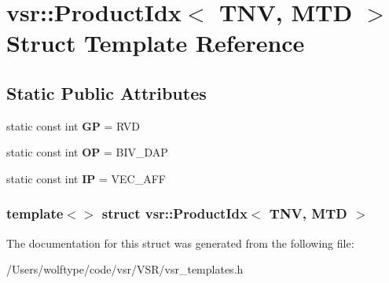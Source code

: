 \hypertarget{structvsr_1_1_product_idx_3_01_t_n_v_00_01_m_t_d_01_4}{\section{vsr\-:\-:Product\-Idx$<$ T\-N\-V, M\-T\-D $>$ Struct Template Reference}
\label{structvsr_1_1_product_idx_3_01_t_n_v_00_01_m_t_d_01_4}
}
\subsection*{Static Public Attributes}
\begin{DoxyCompactItemize}
\item 
\hypertarget{structvsr_1_1_product_idx_3_01_t_n_v_00_01_m_t_d_01_4_afe13c3340442d1068a3e424826551e6e}{static const int {\bfseries G\-P} = R\-V\-D}\label{structvsr_1_1_product_idx_3_01_t_n_v_00_01_m_t_d_01_4_afe13c3340442d1068a3e424826551e6e}

\item 
\hypertarget{structvsr_1_1_product_idx_3_01_t_n_v_00_01_m_t_d_01_4_a05029d10a77f94af3f5ebe42f369819f}{static const int {\bfseries O\-P} = B\-I\-V\-\_\-\-D\-A\-P}\label{structvsr_1_1_product_idx_3_01_t_n_v_00_01_m_t_d_01_4_a05029d10a77f94af3f5ebe42f369819f}

\item 
\hypertarget{structvsr_1_1_product_idx_3_01_t_n_v_00_01_m_t_d_01_4_a330af777fa84e11b86053944602faaf2}{static const int {\bfseries I\-P} = V\-E\-C\-\_\-\-A\-F\-F}\label{structvsr_1_1_product_idx_3_01_t_n_v_00_01_m_t_d_01_4_a330af777fa84e11b86053944602faaf2}

\end{DoxyCompactItemize}
\subsubsection*{template$<$$>$ struct vsr\-::\-Product\-Idx$<$ T\-N\-V, M\-T\-D $>$}



The documentation for this struct was generated from the following file\-:\begin{DoxyCompactItemize}
\item 
/\-Users/wolftype/code/vsr/\-V\-S\-R/vsr\-\_\-templates.\-h\end{DoxyCompactItemize}
